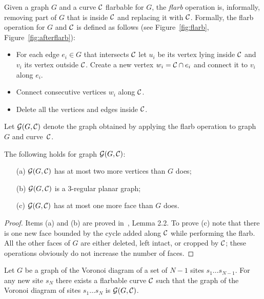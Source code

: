 \documentclass[a4paper,11pt]{article}
\begin{document}
Given a graph $G$ and a curve $\mathcal C$ flarbable for $G$, the \emph{flarb} operation is, informally, removing part of $G$ that is inside $\mathcal C$ and replacing it with $\mathcal C$. Formally, the flarb operation for $G$ and $\mathcal C$ is defined as follows (see Figure~\ref{fig:flarb}, Figure~\ref{fig:afterflarb}):

\begin{itemize}
	\item For each edge $e_i \in G$ that intersects $\mathcal C$ let $u_i$ be its vertex lying inside $\mathcal C$ and $v_i$ its vertex outside $\mathcal C$. Create a new vertex $w_i = \mathcal C \cap e_i$ and connect it to $v_i$ along $e_i$.
	\item Connect consecutive vertices $w_i$ along $\mathcal C$.
	\item Delete all the vertices and edges inside $\mathcal C$.
\end{itemize}

Let $\mathcal G (G,\mathcal C)$ denote the graph obtained by applying the flarb operation to graph~$G$ and curve~$\mathcal C$.

\begin{lemma} The following holds for graph $\mathcal G ( G, \mathcal C )$: \begin{itemize}
	\item[(a)] $\mathcal G ( G, \mathcal C )$ has at most two more vertices than $G$ does;
	\item[(b)] $\mathcal G ( G, \mathcal C )$ is a 3-regular planar graph;
	\item[(c)] $\mathcal G ( G, \mathcal C )$ has at most one more face than $G$ does.
\end{itemize}\end{lemma}

\begin{proof}
	Items (a) and (b) are proved in~\cite{DBLP:journals/dcg/AllenBIL17}, Lemma 2.2. To prove (c) note that there is one new face bounded by the cycle added along $\mathcal C$ while performing the flarb. All the other faces of $G$ are either deleted, left intact, or cropped by $\mathcal C$; these operations obviously do not increase the number of faces.
\end{proof}

\begin{theorem} \label{thm:existsFlarb}
	Let $G$ be a graph of the Voronoi diagram of a set of $N-1$ sites $s_1 \ldots s_{N-1}$. For any new site $s_N$ there exists a flarbable curve $\mathcal C$ such that the graph of the Voronoi diagram of sites $s_1 \ldots s_N$ is $\mathcal G (G, \mathcal C)$.
\end{theorem}
\end{document}
